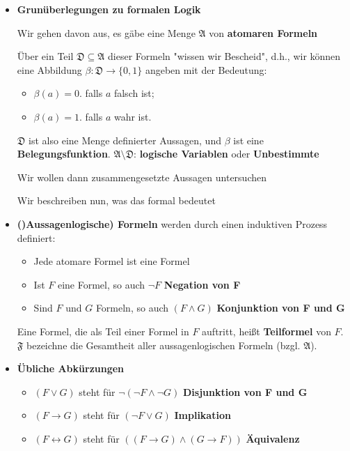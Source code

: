\documentclass[12pt, a4paper]{article}
\begin{document}
	\begin{itemize}
		\item \textbf{Grunüberlegungen zu formalen Logik}
		
		\subitem Wir gehen davon aus, es gäbe eine Menge $\mathfrak{A}$ von \textbf{atomaren Formeln}
		
		\subitem Über ein Teil $\mathfrak{D\subseteq A}$ dieser Formeln "wissen wir Bescheid", d.h., wir können eine Abbildung $\beta:\mathfrak{D}\rightarrow\{0,1\}$ angeben mit der Bedeutung:
		
		\begin{itemize}
			\item $\beta(a)=0$. falls $a$ falsch ist;
			\item $\beta(a)=1$. falls $a$ wahr ist.
		\end{itemize}
		
		\subitem $\mathfrak{D}$ ist also eine Menge definierter Aussagen, und $\beta$ ist eine \textbf{Belegungsfunktion}. $\mathfrak{A\setminus D}$: \textbf{logische Variablen} oder \textbf{Unbestimmte}
		
		\subitem Wir wollen dann zusammengesetzte Aussagen untersuchen
		
		\subitem Wir beschreiben nun, was das formal bedeutet
		
		\item \textbf{()Aussagenlogische) Formeln} werden durch einen induktiven Prozess definiert:
		\begin{itemize}
			\item Jede atomare Formel ist eine Formel
			\item Ist $F$ eine Formel, so auch $\neg F$ \textbf{Negation von F}
			\item Sind $F$ und $G$ Formeln, so auch $(F\wedge G)$ \textbf{Konjunktion von F und G}
		\end{itemize}
		
		\subitem Eine Formel, die als Teil einer Formel in $F$ auftritt, heißt \textbf{Teilformel} von $F$. $\mathfrak{F}$ bezeichne die Gesamtheit aller aussagenlogischen Formeln (bzgl. $\mathfrak{A}$).
		
		\item \textbf{Übliche Abkürzungen}
		\begin{itemize}
			\item $(F\vee G)$ steht für $\neg(\neg F \wedge\neg G)$ \textbf{Disjunktion von F und G}
			\item $(F\rightarrow G)$ steht für $(\neg F\vee G)$ \textbf{Implikation}
			\item $(F\leftrightarrow G)$ steht für $((F\rightarrow G) \wedge(G\rightarrow F))$ \textbf{Äquivalenz}
		\end{itemize}
		

\end{itemize}
\end{document}

